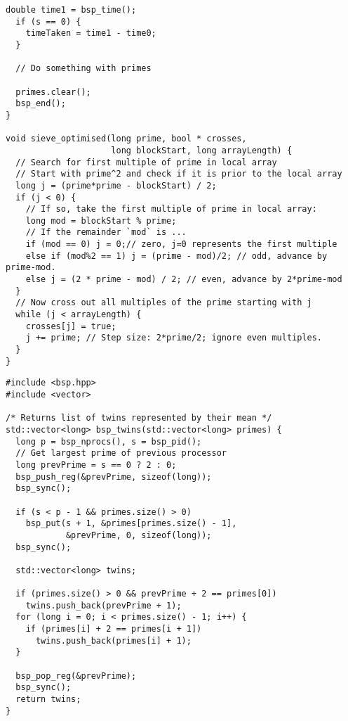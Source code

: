 \documentclass[a4paper,12pt]{article}
\begin{document}
\begin{lstlisting}[caption={Optimised parallel program for the Sieve of Eratosthenes}, label={prg:par_opt_sieve}, frame={single}]
  double time1 = bsp_time();
  if (s == 0) {
    timeTaken = time1 - time0;
  }
  
  // Do something with primes

  primes.clear();
  bsp_end();
}

void sieve_optimised(long prime, bool * crosses,
                     long blockStart, long arrayLength) {
  // Search for first multiple of prime in local array
  // Start with prime^2 and check if it is prior to the local array
  long j = (prime*prime - blockStart) / 2;
  if (j < 0) {
    // If so, take the first multiple of prime in local array:
    long mod = blockStart % prime;
    // If the remainder `mod` is ...
    if (mod == 0) j = 0;// zero, j=0 represents the first multiple
    else if (mod%2 == 1) j = (prime - mod)/2; // odd, advance by prime-mod.
    else j = (2 * prime - mod) / 2; // even, advance by 2*prime-mod
  }
  // Now cross out all multiples of the prime starting with j
  while (j < arrayLength) {
    crosses[j] = true;
    j += prime; // Step size: 2*prime/2; ignore even multiples.
  }
}
	\end{lstlisting}

	\begin{lstlisting}[caption={Extension function for finding twin primes}, label={prg:twin-primes}, frame={single}]
#include <bsp.hpp>
#include <vector>

/* Returns list of twins represented by their mean */
std::vector<long> bsp_twins(std::vector<long> primes) {
  long p = bsp_nprocs(), s = bsp_pid();
  // Get largest prime of previous processor
  long prevPrime = s == 0 ? 2 : 0;
  bsp_push_reg(&prevPrime, sizeof(long));
  bsp_sync();

  if (s < p - 1 && primes.size() > 0)
    bsp_put(s + 1, &primes[primes.size() - 1],
            &prevPrime, 0, sizeof(long));
  bsp_sync();

  std::vector<long> twins;

  if (primes.size() > 0 && prevPrime + 2 == primes[0])
    twins.push_back(prevPrime + 1);
  for (long i = 0; i < primes.size() - 1; i++) {
    if (primes[i] + 2 == primes[i + 1])
      twins.push_back(primes[i] + 1);
  }

  bsp_pop_reg(&prevPrime);
  bsp_sync();
  return twins;
}
	\end{lstlisting}
	
\end{document}
